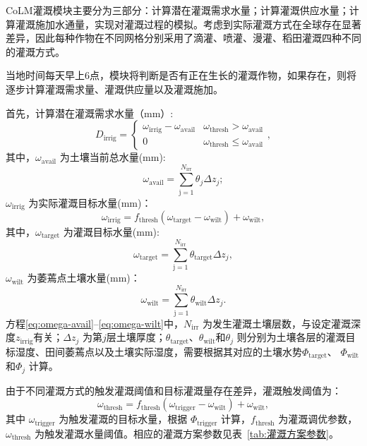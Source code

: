 CoLM灌溉模块主要分为三部分：计算潜在灌溉需求水量；计算灌溉供应水量；计算灌溉施加水通量，实现对灌溉过程的模拟。考虑到实际灌溉方式在全球存在显著差异，因此每种作物在不同网格分别采用了滴灌、喷灌、漫灌、稻田灌溉四种不同的灌溉方式。

当地时间每天早上6点，模块将判断是否有正在生长的灌溉作物，如果存在，则将逐步计算灌溉需求量、灌溉供应量以及灌溉施加。

首先，计算潜在灌溉需求水量（mm）:
\begin{equation}
    D_{\mathrm{irrig}} = \begin{cases}
        \omega_{\mathrm{irrig}} - \omega_{\mathrm{avail}} & \omega_{\mathrm{thresh}} > \omega_{\mathrm{avail}} \\
        0     & \omega_{\mathrm{thresh}} \leqslant \omega_{\mathrm{avail}}
    \end{cases},
\end{equation}
其中，$\omega_{\mathrm{avail}}$ 为土壤当前总水量(mm):
\begin{equation}\label{eq:omega-avail}
    \omega_{\mathrm{avail}} = \sum_{\mathrm{j=1}}^{N_{\mathrm{irr}}}\theta_j\Delta z_j;
\end{equation}
$\omega_{\mathrm{irrig}}$ 为实际灌溉目标水量(mm)：
\begin{equation}
    \omega_{\mathrm{irrig}} = f_{\mathrm{thresh}}(\omega_{\mathrm{target}}-\omega_{\mathrm{wilt}}) + \omega_{\mathrm{wilt}},
\end{equation}
其中，$\omega_{\mathrm{target}}$ 为灌溉目标水量(mm):
\begin{equation}
    \omega_{\mathrm{target}} = \sum_{\mathrm{j=1}}^{N_{\mathrm{irr}}}\theta_{\mathrm{target}}\Delta z_j,
\end{equation}
$\omega_{\mathrm{wilt}}$ 为萎蔫点土壤水量(mm)：
\begin{equation}\label{eq:omega-wilt}
    \omega_{\mathrm{wilt}} = \sum_{\mathrm{j=1}}^{N_{\mathrm{irr}}}\theta_{\mathrm{wilt}}\Delta z_j.
\end{equation}
方程\eqref{eq:omega-avail}--\eqref{eq:omega-wilt}中，$N_{\mathrm{irr}}$ 为发生灌溉土壤层数，与设定灌溉深度$z_{\mathrm{irrig}}$有关；$\Delta z_j$ 为第$j$层土壤厚度；$\theta_{\mathrm{target}}$、$\theta_{\mathrm{wilt}}$和$\theta_j$ 则分别为土壤各层的灌溉目标湿度、田间萎蔫点以及土壤实际湿度，需要根据其对应的土壤水势$\Phi_{\mathrm{target}}$、 $\Phi_{\mathrm{wilt}}$和$\Phi_j$ 计算。

由于不同灌溉方式的触发灌溉阈值和目标灌溉量存在差异，灌溉触发阈值为：
\begin{equation}
    \omega_{\mathrm{thresh}} = f_{\mathrm{thresh}}(\omega_{\mathrm{trigger}}-\omega_{\mathrm{wilt}}) + \omega_{\mathrm{wilt}},
\end{equation}
其中 $\omega_{\mathrm{trigger}}$ 为触发灌溉的目标水量，根据 $\Phi_{\mathrm{trigger}}$ 计算，$f_{\mathrm{thresh}}$ 为灌溉调优参数，$\omega_{\mathrm{thresh}}$ 为触发灌溉水量阈值。相应的灌溉方案参数见表~\ref{tab:灌溉方案参数}。

